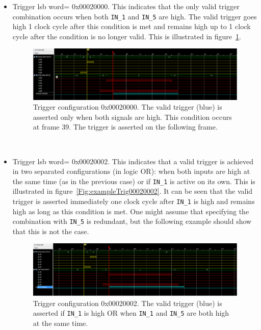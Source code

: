 \begin{itemize}
    \item Trigger \gls{lsb} word= 0x00020000. This indicates that the only valid trigger combination occurs when both \verb|IN_1| and \verb|IN_5| are high. The valid trigger goes high 1 clock cycle after this condition is met and remains high up to 1 clock cycle after the condition is no longer valid. This is illustrated in figure~\ref{Fig:exampleTrig00020000}.
        \begin{figure}
            \centering
            \includegraphics[width=.90\textwidth]{./Images/Trigger0x00020000.png}
            \caption{Trigger configuration 0x00020000. The valid trigger (blue) is asserted only when both signals are high. This condition occurs at frame 39. The trigger is asserted on the following frame.}
            \label{Fig:exampleTrig00020000}
        \end{figure}\\
    \item Trigger \gls{lsb} word= 0x00020002. This indicates that a valid trigger is achieved in two separated configurations (in logic OR): when both inputs are high at the same time (as in the previous case) or if \verb|IN_1| is active on its own. This is illustrated in figure~\ref{Fig:exampleTrig00020002}. It can be seen that the valid trigger is asserted immediately one clock cycle after \verb|IN_1| is high and remains high as long as this condition is met. One might assume that specifying the combination with \verb|IN_5| is redundant, but the following example should show that this is not the case.
        \begin{figure}
            \centering
            \includegraphics[width=.90\textwidth]{./Images/Trigger0x00020002.png}
            \caption{Trigger configuration 0x00020002. The valid trigger (blue) is asserted if \texttt{IN\_1} is high OR when \texttt{IN\_1} and \texttt{IN\_5} are both high at the same time.}

\end{figure}
\end{itemize}
